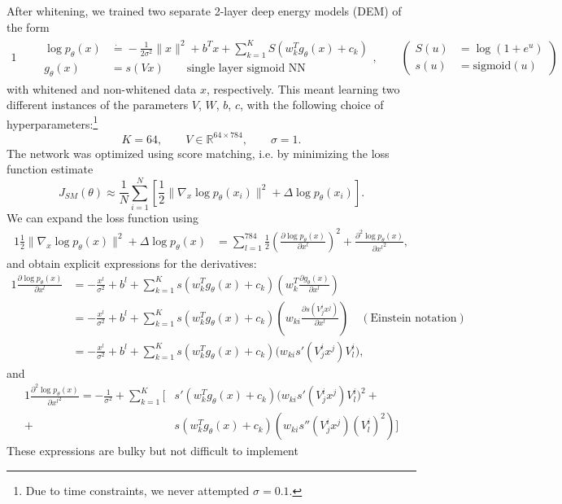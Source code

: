 \documentclass[a4paper]{article}
\theoremstyle{definition}
\theoremstyle{plain}
\begin{document}
After whitening, we trained two separate 2-layer deep energy models (DEM) of the form
\begin{alignat*}{1}
\qquad \begin{aligned}\log p_\theta(x) &\dot{=}-\frac{1}{2\sigma^2} \|x\|^2 + b^T x + \sum_{k=1}^K S(w_k^T g_\theta(x) + c_k)\\
g_\theta(x) &= s(Vx) \qquad \text{single layer sigmoid NN}\end{aligned}, \qquad \left(\begin{aligned} S(u) &= \log(1 + e^u)\\ s(u) &= \text{sigmoid}(u)\end{aligned} \right)
\end{alignat*}
with whitened and non-whitened data $x$, respectively. This meant learning two different instances of the parameters $V$, $W$, $b$, $c$, with the following choice of hyperparameters:\footnote{Due to time constraints, we never attempted $\sigma = 0.1$.}
$$K = 64, \qquad V \in \mathbb{R}^{64\times 784}, \qquad \sigma = 1.$$
The network was optimized using score matching, i.e. by minimizing the loss function estimate
$$J_{SM}(\theta) \approx \frac{1}{N} \sum_{i=1}^N \left[ \frac{1}{2} \| \nabla_x \log p_\theta(x_i)\|^2 + \Delta \log p_\theta(x_i)\right].$$
We can expand the loss function using
\begin{alignat*}{1}
\frac{1}{2}\| \nabla_x \log p_\theta(x)\|^2 + \Delta \log p_\theta(x) &= \sum_{l=1}^{784} \frac{1}{2} \left( \frac{\partial \log p_\theta(x)}{\partial x^l}\right)^2 + \frac{\partial^2 \log p_\theta(x)}{\partial {x^l}^2},
\end{alignat*}
and obtain explicit expressions for the derivatives:
\begin{alignat*}{1}
\frac{\partial \log p_\theta(x) }{\partial x^l} &= -\frac{x^l}{\sigma^2} + b^l + \sum_{k=1}^K s(w_k^T g_\theta(x) + c_k) \left( w_k^T \frac{\partial g_\theta(x)}{\partial x^l} \right)\\
&= -\frac{x^l}{\sigma^2} + b^l + \sum_{k=1}^K s(w_k^T g_\theta(x) + c_k) \left(  w_{ki} \frac{\partial s\left(V_j^i x^j\right)}{\partial x^l} \right) \quad (\text{Einstein notation})\\
&=  -\frac{x^l}{\sigma^2} + b^l + \sum_{k=1}^K s(w_k^T g_\theta(x) + c_k) \Big( w_{ki} s'(V_j^i x^j ) V_l^i\Big), 
\end{alignat*}
 and
\begin{alignat*}{1}
\frac{\partial^2 \log p_\theta(x)}{\partial {x^l}^2} = -\frac{1}{\sigma^2} +  \sum_{k=1}^K \Bigg[ &s'(w_k^T g_\theta(x) + c_k) \Big( w_{ki} s'(V_ j^i x^j ) V_l^i\Big)^2 +\\
+ \  &s(w_k^T g_\theta(x) + c_k)  \left( w_{ki} s''\left( V_j^i x^j \right) \left(V_l^i\right)^2 \right)\Bigg]
\end{alignat*}
These expressions are bulky but not difficult to implement
\end{document}
